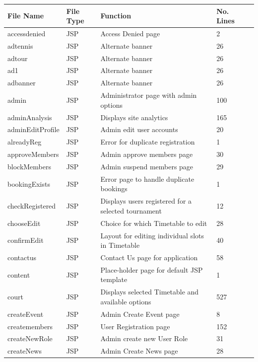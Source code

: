 \begin{table}[H]
\begin{center}
     \begin{tabular}{| l | l | l| l |p{1cm} |}
    \hline
    File Name & File Type & Function & No. Lines\\ \hline
	accessdenied & JSP & Access Denied page & 2\\ \hline
	adtennis & JSP & Alternate banner & 26\\ \hline	
	adtour & JSP & Alternate banner & 26\\ \hline	
	ad1 & JSP & Alternate banner & 26\\ \hline	
	adbanner & JSP & Alternate banner & 26\\ \hline		
	admin & JSP & Administrator page with admin options & 100\\ \hline	
	adminAnalysis & JSP & Displays site analytics & 165\\ \hline	
	adminEditProfile & JSP & Admin edit user accounts & 20\\ \hline	
	alreadyReg & JSP & Error for duplicate registration & 1 \\ \hline	
	approveMembers & JSP & Admin approve members page & 30\\ \hline	
	blockMembers & JSP & Admin suspend members page & 29\\ \hline	
	bookingExists & JSP & Error page to handle duplicate bookings & 1\\ \hline	
	checkRegistered & JSP & Displays users registered for a selected tournament & 12\\ \hline	
	chooseEdit & JSP & Choice for which Timetable to edit & 28\\ \hline	
	confirmEdit & JSP & Layout for editing individual slots in Timetable & 40\\ \hline	
	contactus & JSP & Contact Us page for application & 58\\ \hline	
	content & JSP & Place-holder page for default JSP template & 1\\ \hline	
	court & JSP & Displays selected Timetable and available options & 527\\ \hline	
	createEvent & JSP & Admin Create Event page & 8\\ \hline	
	createmembers & JSP & User Registration page & 152\\ \hline	
	createNewRole & JSP & Admin create new User Role & 31\\ \hline	
	createNews & JSP & Admin Create News page & 28\\ \hline	

\end{tabular}
\end{center}
\end{table}
